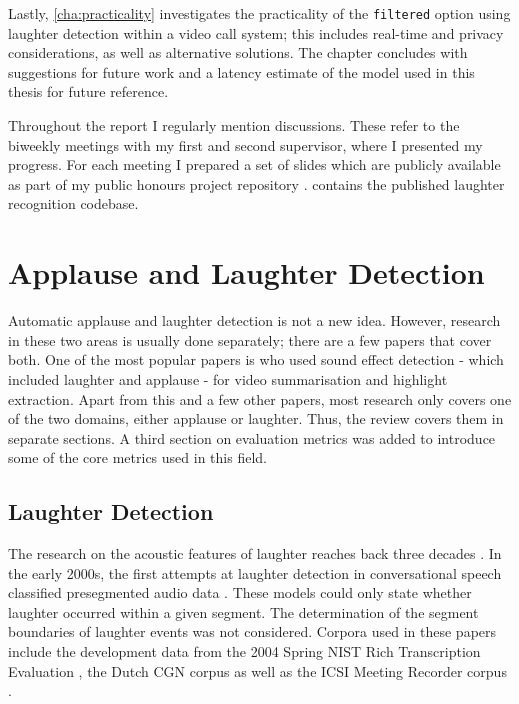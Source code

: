 \documentclass[bsc,frontabs,parskip,deptreport]{infthesis}
\begin{document}
Lastly, \autoref{cha:practicality} investigates the practicality of the \texttt{filtered} option using laughter detection within a video call system; this includes real-time and privacy considerations, as well as alternative solutions. The chapter concludes with suggestions for future work and a latency estimate of the model used in this thesis for future reference. 

Throughout the report I regularly mention discussions. These refer to the biweekly meetings with my first and second supervisor, where I presented my progress. For each meeting I prepared a set of slides which are publicly available as part of my public honours project repository \citep{Wolter_Honours_Project_2021_22_2022}.
\citet{Wolter_A_Machine_Learning_2022} contains the published laughter recognition codebase. 


\chapter{Applause and Laughter Detection} \label{cha:bg}
Automatic applause and laughter detection is not a new idea. However, research in these two areas is usually done separately; there are a few papers that cover both. One of the most popular papers is \citet{cai2003highlight} who used sound effect detection - which included laughter and applause - for video summarisation and highlight extraction.
Apart from this and a few other papers, most research only covers one of the two domains, either applause or laughter. Thus, the review covers them in separate sections. A third section on evaluation metrics was added to introduce some of the core metrics used in this field. 

\section{Laughter Detection} \label{sec:bg-laughter}
The research on the acoustic features of laughter reaches back three decades \citep{bickley1992acoustic}.
In the early 2000s, the first attempts at laughter detection in conversational speech classified presegmented audio data \citep{kennedy2004laughter, truong2005automatic}. These models could only state whether laughter occurred within a given segment. The determination of the segment boundaries of laughter events was not considered. 
Corpora used in these papers include the development data from the 2004 Spring NIST Rich Transcription Evaluation \citep{nist-recordings}, the Dutch CGN corpus \citep{oostdijk2000spoken} as well as the ICSI Meeting Recorder corpus \citep{morgan2001meeting}. 
\end{document}
